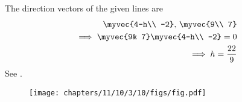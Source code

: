 The direction vectors of the given lines are 
\begin{align}
\myvec{4-h\\ -2}
,\,
\myvec{9\\ 7}
\\
\implies 
\myvec{9& 7}\myvec{4-h\\ -2}=0\\
\implies h=\frac{22}{9}
\end{align}
See  
		.
\begin{figure}[H]
\centering
\texttt{[image: chapters/11/10/3/10/figs/fig.pdf]}
\caption{}
		\label{fig:chapters/11/10/3/10/Figure}
\end{figure}
